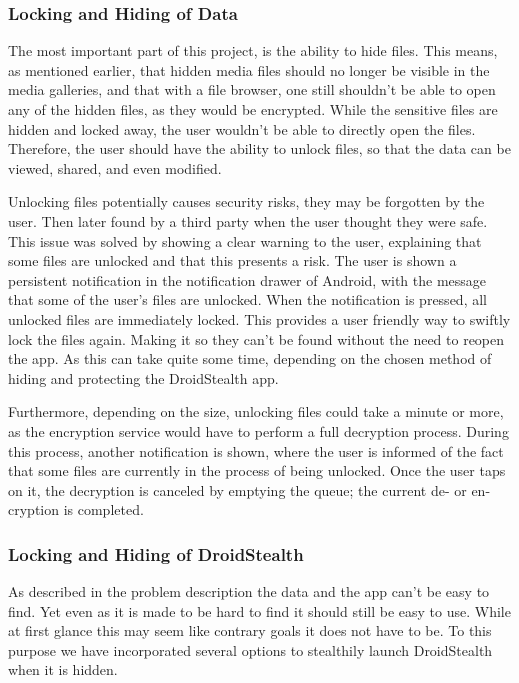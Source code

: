 \subsubsection{Locking and Hiding of Data}

The most important part of this project, is the ability to hide
files. This means, as mentioned earlier, that hidden media
files should no longer be visible in the media
galleries, and that with a file browser, one still shouldn't be
able to open any of the hidden files, as they would be
encrypted. While the sensitive
files are hidden and locked away, the user wouldn't be able to
directly open the files. Therefore, the user should have the
ability to unlock files, so that the data can be viewed,
shared, and even modified.

Unlocking files potentially causes security risks, they may be
forgotten by the user. Then later found by a third party when the user thought they were safe.
This issue was solved by showing
a clear warning to the user, explaining that some files are
unlocked and that this presents a risk.
The user is shown a persistent notification in the
notification drawer of Android, with the message that some of
the user's files are unlocked. When the notification is pressed,
all unlocked files are immediately locked. This
provides a user friendly way to swiftly lock the files again. Making it so
they can't be found without the need to reopen the app. As this
can take quite some time, depending on the chosen method of
hiding and protecting the DroidStealth app. 

Furthermore, depending on the size, unlocking files could take a
minute or more, as the encryption service would have to perform a
full decryption process. During this process, another notification 
is shown, where the user is informed
of the fact that some files are currently in the process of
being unlocked. Once the user taps on it, the decryption is
canceled by emptying the queue; the current de- or en-cryption is completed.


\subsubsection{Locking and Hiding of DroidStealth}

As described in the problem description the data and the app can't be easy to find.
Yet even as it is made to be hard to find it should still be easy to use.
While at first glance this may seem like contrary goals it does not have to be.
To this purpose we have incorporated several options to stealthily launch DroidStealth when it is hidden.

